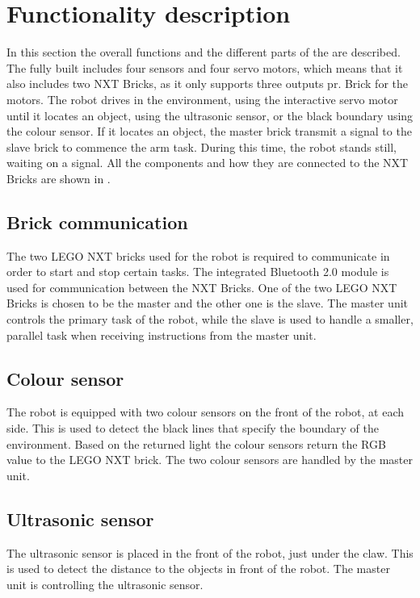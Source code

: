 \section{Functionality description} \label{sec:functionality_description}
In this section the overall functions and the different parts of the \projname{} are described. The fully built \projname{} includes four sensors and four servo motors, which means that it also includes two NXT Bricks, as it only supports three outputs pr. Brick for the motors. The robot drives in the environment, using the interactive servo motor until it locates an object, using the ultrasonic sensor, or the black boundary using the colour sensor. If it locates an object, the master brick transmit a signal to the slave brick to commence the arm task. During this time, the robot stands still, waiting on a signal. All the components and how they are connected to the NXT Bricks are shown in . 

\subsection{Brick communication}
The two LEGO NXT bricks used for the robot is required to communicate in order to start and stop certain tasks. The integrated Bluetooth 2.0 module is used for communication between the NXT Bricks. One of the two LEGO NXT Bricks is chosen to be the master and the other one is the slave. The master unit controls the primary task of the robot, while the slave is used to handle a smaller, parallel task when receiving instructions from the master unit.

\subsection{Colour sensor} 
The robot is equipped with two colour sensors on the front of the robot, at each side. This is used to detect the black lines that specify the boundary of the environment. Based on the returned light the colour sensors return the RGB value to the LEGO NXT brick. The two colour sensors are handled by the master unit. 

\subsection{Ultrasonic sensor}
The ultrasonic sensor is placed in the front of the robot, just under the claw. This is used to detect the distance to the objects in front of the robot. The master unit is controlling the ultrasonic sensor.


